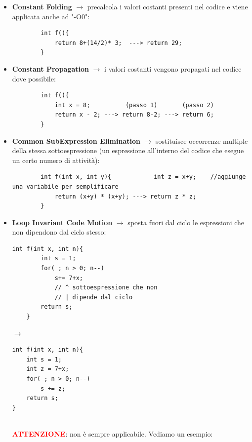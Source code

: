 \begin{itemize}
    \item \textbf{Constant Folding} $\rightarrow$ precalcola i valori costanti presenti nel codice
    e viene applicata anche ad "-O0":
    \begin{verbatim}
        int f(){
            return 8+(14/2)* 3;  ---> return 29;
        }
    \end{verbatim}
    \item \textbf{Constant Propagation} $\rightarrow$ i valori costanti vengono propagati nel codice
    dove possibile:
    \begin{verbatim}
        int f(){
            int x = 8;          (passo 1)       (passo 2)
            return x - 2; ---> return 8-2; ---> return 6;
        }
    \end{verbatim}
    \item \textbf{Common SubExpression Elimination} $\rightarrow$ sostituisce occorrenze multiple della 
    stessa sottoespressione (un espressione all'interno del codice che esegue un certo numero di attività):
    \begin{verbatim}
        int f(int x, int y){            int z = x+y;    //aggiunge una variabile per semplificare
            return (x+y) * (x+y); ---> return z * z;
        }
    \end{verbatim}
    \item \textbf{Loop Invariant Code Motion} $\rightarrow$ sposta fuori dal ciclo le espressioni che non dipendono
    dal ciclo stesso:\medskip\\
    \begin{minipage}{0.4\textwidth}
    \begin{verbatim}
int f(int x, int n){
        int s = 1;
        for( ; n > 0; n--)
            s+= 7+x;
            // ^ sottoespressione che non 
            // | dipende dal ciclo
        return s;
    }
    \end{verbatim}
    \end{minipage}
    \hfill
    $\longrightarrow$
    \hfill
    \begin{minipage}{0.4\textwidth}
        \begin{verbatim}
int f(int x, int n){
    int s = 1;
    int z = 7+x;
    for( ; n > 0; n--)
        s += z;
    return s;
}
        \end{verbatim}
    \end{minipage}\medskip\\
\noindent\textbf{\textcolor{red}{ATTENZIONE}}: non è sempre applicabile. Vediamo un esempio:

\end{itemize}
